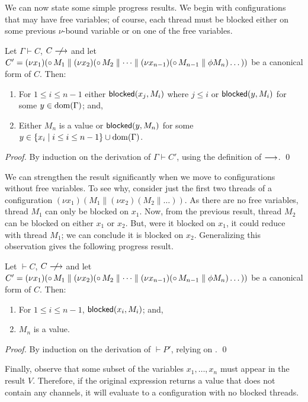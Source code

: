 \documentclass[oribibl,orivec,envcountsame]{llncs}
\begin{document}
We can now state some simple progress results.  We begin with configurations that may have free
variables; of course, each thread must be blocked either on some previous $\nu$-bound variable or on
one of the free variables.
%
\begin{theorem}\label{thm:progress-open}
  Let $\Gamma \vdash C$, $C \centernot\ceval$ and let $C' = (\nu x_1)({\mathord{\circ}}\,M_1 \parallel (\nu
  x_2)({\mathord{\circ}}\,M_2 \parallel \dots \parallel (\nu x_{n-1})({\mathord{\circ}}\,M_{n-1} \parallel \phi M_n)\dots))$ be a
  canonical form of $C$.  Then:
  \begin{enumerate}
  \item For $1 \leq i \leq n - 1$ either $\mathsf{blocked}(x_j,M_i)$ where $j \leq i$ or $\mathsf{blocked}(y,M_i)$
    for some $y \in \operatorname{dom}(\Gamma)$; and,
  \item Either $M_n$ is a value or $\mathsf{blocked}(y,M_n)$ for some $y \in \{ x_i \mid i \leq i \leq n -
    1 \} \cup \operatorname{dom}(\Gamma)$.
  \end{enumerate}
\end{theorem}
%
\begin{proof}
  By induction on the derivation of $\Gamma \vdash C'$, using the definition of $\longrightarrow$. \qed
\end{proof}

We can strengthen the result significantly when we move to configurations without free variables.
To see why, consider just the first two threads of a configuration $(\nu x_1)(M_1 \parallel (\nu
x_2)(M_2 \parallel \dots))$.  As there are no free variables, thread $M_1$ can only be blocked on
$x_1$.  Now, from the previous result, thread $M_2$ can be blocked on either $x_1$ or $x_2$.  But,
were it blocked on $x_1$, it could reduce with thread $M_1$; we can conclude it is blocked on $x_2$.
Generalizing this observation gives the following progress result.
%
\begin{corollary}\label{thm:progress}
  Let $\vdash C$, $C \centernot\ceval$ and let $C' = (\nu x_1)({\mathord{\circ}}\,M_1 \parallel (\nu
  x_2)({\mathord{\circ}}\,M_2 \parallel \dots \parallel (\nu x_{n-1})({\mathord{\circ}}\,M_{n-1} \parallel
  \phi M_n)\dots))$ be a canonical form of $C$.  Then:
  \begin{enumerate}
  \item For $1 \leq i \leq n - 1$, $\mathsf{blocked}(x_i,M_i)$; and,
  \item $M_n$ is a value.
  \end{enumerate}
\end{corollary}
%
\begin{proof}
  By induction on the derivation of $\vdash P'$, relying on .  \qed
\end{proof}
%
Finally, observe that some subset of the variables $x_1,\dots,x_n$ must appear in the result $V$.
Therefore, if the original expression returns a value that does not contain any channels, it will
evaluate to a configuration with no blocked threads.
\end{document}
